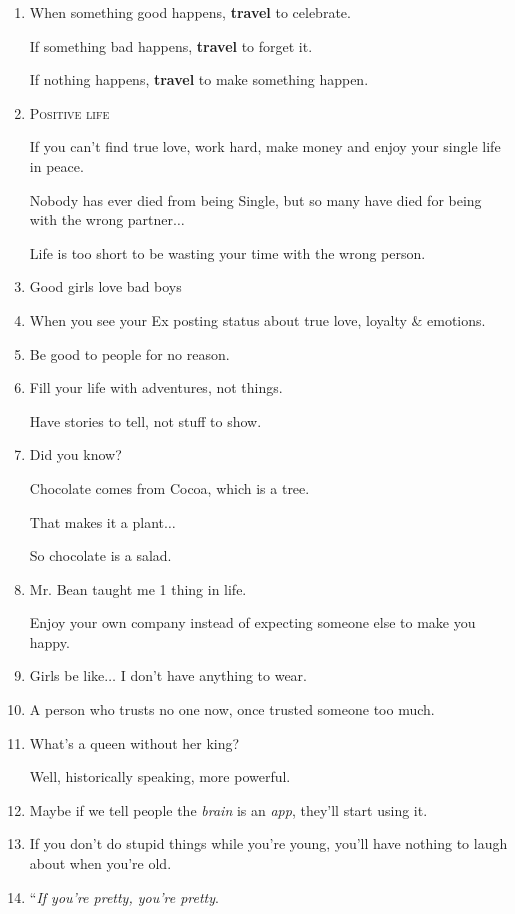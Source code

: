 \documentclass{article}
\numberwithin{equation}{section}
\begin{document}
\begin{enumerate}
    \textit{Because their eyes are open to a world that is in need of repair}.
    
    \textit{They literally have an increased ability to feel the emotions of people around them}.'' - Osho
    \item When something good happens, \textbf{travel} to celebrate.
    
    If something bad happens, \textbf{travel} to forget it.
    
    If nothing happens, \textbf{travel} to make something happen.
    \item \textsc{Positive life}
    
    If you can't find true love, work hard, make money and enjoy your single life in peace.
    
    Nobody has ever died from being Single, but so many have died for being with the wrong partner$\ldots$
    
    Life is too short to be wasting your time with the wrong person.
    \item Good girls love bad boys
    \item When you see your Ex posting status about true love, loyalty \& emotions.
    \item Be good to people for no reason.
    \item Fill your life with adventures, not things.
    
    Have stories to tell, not stuff to show.
    \item Did you know?
    
    Chocolate comes from Cocoa, which is a tree.
    
    That makes it a plant$\ldots$
    
    So chocolate is a salad.
    \item Mr. Bean taught me 1 thing in life.
    
    Enjoy your own company instead of expecting someone else to make you happy.
    \item Girls be like$\ldots$ I don't have anything to wear.
    \item A person who trusts no one now, once trusted someone too much.
    \item What's a queen without her king?
    
    Well, historically speaking, more powerful.
    \item Maybe if we tell people the \textit{brain} is an \textit{app}, they'll start using it.
    \item If you don't do stupid things while you're young, you'll have nothing to laugh about when you're old.
    \item ``\textit{If you're pretty, you're pretty}.
    

\end{enumerate}
\end{document}
